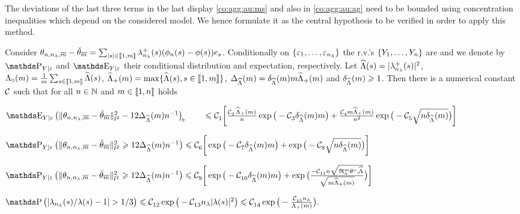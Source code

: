 \begin{te}
The deviations of the last three terms in the last display
\eqref{co:agg:au:ms} and also in \eqref{co:agg:au:ag} need to be bounded using concentration inequalities which depend on the considered model.
We hence formulate it as the central hypothesis to be verified in order to apply this method.
\end{te}

\begin{as}\label{freq:ge:strat:uk:qu:as}
  Consider
  $\hxdfPr-\dxdfPr=\sum_{|s|\in\nset{1,\Di}}\hfedfmpI[(s)](\hfydf[(s)]-\fydf[(s)])\bas_s$.
  Conditionally on $\{\rE_1,\dotsc,\rE_{\ssE}\}$ the r.v.'s
  $\{\rY_1,\dotsc,\rY_{\ssY}\}$ are \iid and we denote by
  $\P_{Y\vert \epsilon}$ and $\E_{\rY\vert\rE}$ their conditional
  distribution and expectation, respectively.  Let
  $\eiSv[(s)]=|\hfedfmpI[(s)]|^2$,
  $\oeiSv=\tfrac{1}{\Di}\sum_{s\in\nset{1,\Di}}\eiSv[(s)]$,
  $\meiSv= \max\{\eiSv[(s)],s\in\nset{1,\Di}\}$,
  $\DiepenSv=\cmeiSv\Di \meiSv$ and $\cmeiSv\geq1$.  Then there is a
  numerical constant $\cst{}$ such that for all $\ssY\in\Nz$ and
  $\Di\in\nset{1,\ssY}$ holds
  \begin{resListeN}[]
  \item\label{freq:ge:strat:uk:qu:as:i}
    $\E_{\rY\vert\rE} \vectp{\Vnormlp{\hxdfPr-\dxdfPr}^2 - 12\DiepenSv\ssY^{-1}}   \\
    \quad\quad\leq\cst{1} \bigg[\tfrac{\cst{2}\,\meiSv}{\ssY}
    \exp\big(-\cst{3}\cmeiSv\Di\big)
    +\tfrac{\cst{4}\Di\meiSv}{n^2}\exp\big(-\cst{5}\sqrt{\ssY\cmeiSv}\big) \bigg]$
  \item\label{freq:ge:strat:uk:qu:as:ii}
$\P_{Y\vert \epsilon}\big(\Vnormlp{\hxdfPr-\dxdfPr}^2 \geq 12\DiepenSv\ssY^{-1}\big)\\
\leq 
\cst{6} \bigg[\exp\big(-\cst{7}\cmeiSv\Di\big)
+\exp\big(-\cst{8}\sqrt{\ssY\cmeiSv}\big)\bigg]$
   \item\label{freq:ge:strat:uk:qu:as:iii}
     $\P_{Y\vert \epsilon}\big(\Vnormlp{\hxdfPr-\dxdfPr}^2 \geq 12\DiepenSv\ssY^{-1}\big)\\
     \leq 
     \cst{9} \bigg[\exp\big(-\cst{10}\cmeiSv\Di\big)
     +\exp\big(\tfrac{-\cst{11}\ssY\sqrt{\daRa{\Di}{\xdf,\eiSv}}}{\sqrt{\Di\meiSv}}\big)\bigg]$
   \item\label{freq:ge:strat:uk:qu:as:iv}
   $\P\big(|\hfedf[(s)]/\fedf[(s)]-1|>1/3\big)\leq \cst{12}\exp\big(-\cst{13}\ssE|\fedf[(s)]|^2\big)\leq \cst{14}\exp\big(-\tfrac{\cst{15}\ssE}{\miSv}\big).$
\end{resListeN}
\assEnd
\end{as}

